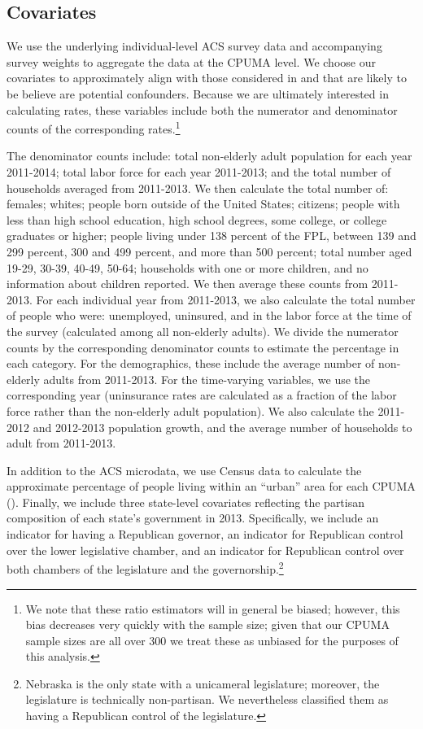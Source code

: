 \documentclass[12pt]{article}
\begin{document}
\subsection{Covariates}

We use the underlying individual-level ACS survey data and accompanying survey weights to aggregate the data at the CPUMA level. We choose our covariates to approximately align with those considered in \cite{courtemanche2017early} and that are likely to be believe are potential confounders. Because we are ultimately interested in calculating rates, these variables include both the numerator and denominator counts of the corresponding rates.\footnote{We note that these ratio estimators will in general be biased; however, this bias decreases very quickly with the sample size; given that our CPUMA sample sizes are all over 300 we treat these as unbiased for the purposes of this analysis.}

The denominator counts include: total non-elderly adult population for each year 2011-2014; total labor force for each year 2011-2013; and the total number of households averaged from 2011-2013. We then calculate the total number of: females; whites; people born outside of the United States; citizens; people with less than high school education, high school degrees, some college, or college graduates or higher; people living under 138 percent of the FPL, between 139 and 299 percent, 300 and 499 percent, and more than 500 percent; total number aged 19-29, 30-39, 40-49, 50-64; households with one or more children, and no information about children reported. We then average these counts from 2011-2013. For each individual year from 2011-2013, we also calculate the total number of people who were: unemployed, uninsured, and in the labor force at the time of the survey (calculated among all non-elderly adults). We divide the numerator counts by the corresponding denominator counts to estimate the percentage in each category. For the demographics, these include the average number of non-elderly adults from 2011-2013. For the time-varying variables, we use the corresponding year (uninsurance rates are calculated as a fraction of the labor force rather than the non-elderly adult population). We also calculate the 2011-2012 and 2012-2013 population growth, and the average number of households to adult from 2011-2013. 

In addition to the ACS microdata, we use Census data to calculate the approximate percentage of people living within an ``urban'' area for each CPUMA (\cite{census}). Finally, we include three state-level covariates reflecting the partisan composition of each state's government in 2013. Specifically, we include an indicator for having a Republican governor, an indicator for Republican control over the lower legislative chamber, and an indicator for Republican control over both chambers of the legislature and the governorship.\footnote{Nebraska is the only state with a unicameral legislature; moreover, the legislature is technically non-partisan. We nevertheless classified them as having a Republican control of the legislature.} 
\end{document}

